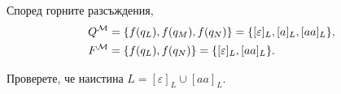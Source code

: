Според горните разсъждения, 
\begin{align*}
  Q^{\mathcal{M}} & = \{f(q_L),f(q_M),f(q_N)\} = \{[\varepsilon]_L, [a]_L, [aa]_L\},\\
  F^{\mathcal{M}} & = \{f(q_L), f(q_N)\} = \{[\varepsilon]_L, [aa]_L\}.
\end{align*}

Проверете, че наистина $L = [\varepsilon]_L \cup [aa]_L$.

